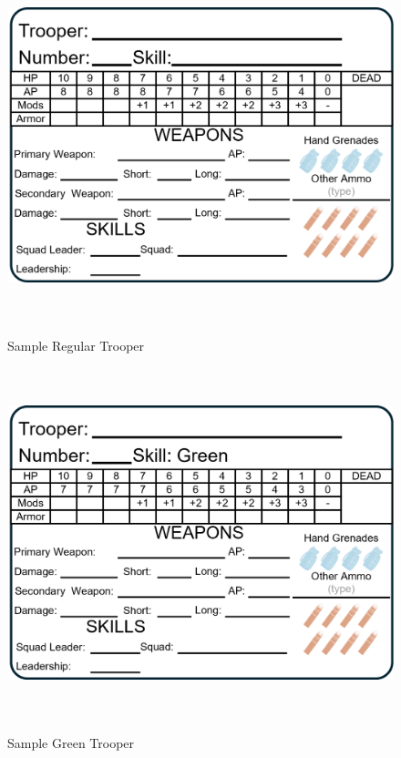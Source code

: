 \begin{figure}[H]
  \centering
  \includegraphics[alt='Sample Regular Trooper', width=5.63in, height=4in]{img/RegularTrooper.png}
  \caption*{Sample Regular Trooper}
\end{figure}

\begin{figure}[H]
  \centering
  \includegraphics[alt='Sample Green Trooper', width=5.63in, height=4in]{img/GreenTrooper.png}
  \caption*{Sample Green Trooper}
\end{figure}

